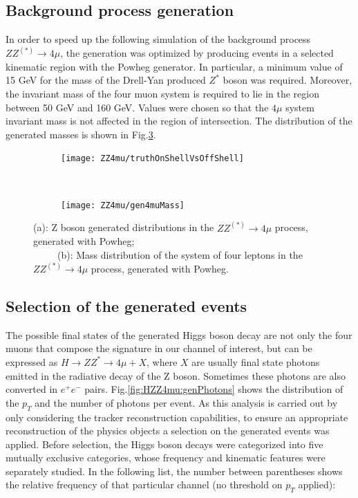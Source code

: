 \documentclass[a4paper,twoside,12pt]{book}
\begin{document}
\subsection{Background process generation}\label{physics:bkgGeneration}
In order to speed up the following simulation of the background process $ZZ^{(*)} \rightarrow 4\mu$, the generation was optimized by
producing events in a selected kinematic region with the Powheg generator\cite{Powheg}. In particular, a minimum value of 15 GeV for the mass of
the Drell-Yan produced $Z^*$ boson was required. Moreover, the invariant mass of the four muon system is required 
to lie in the region between 50 GeV and 160 GeV. Values were chosen so that the $4\mu$ system invariant mass is not affected in the region of intersection. The distribution of the generated masses is shown 
in Fig.\ref{fig:ZZ4mu:genMasses}.\\

\begin{figure}
\begin{subfigure}{\linewidth}
\centering
\texttt{[image: ZZ4mu/truthOnShellVsOffShell]}
\caption{}
\label{fig:ZZ4mu:truthOnShellVsOffShell}
\end{subfigure}\\[1 ex]
\begin{subfigure}{\linewidth}
\centering
\texttt{[image: ZZ4mu/gen4muMass]}
\caption{}
\label{fig:ZZ4mu:gen4muMass}
\end{subfigure}
\caption{(a): Z boson generated distributions in the $ZZ^{(*)} \rightarrow 4\mu$ process, generated with Powheg;\\
\ \ \ \ \ (b): Mass distribution of the system of four leptons in the $ZZ^{(*)} \rightarrow 4\mu$ process, generated with Powheg.}
\label{fig:ZZ4mu:genMasses}
\end{figure}


\subsection{Selection of the generated events}
The possible final states of the generated Higgs boson decay are not only the four muons that 
compose the signature in our channel of interest, but can be expressed as $H \rightarrow
ZZ^* \rightarrow 4\mu + X$, where $X$ are usually final state photons emitted in the
radiative decay of the Z boson. Sometimes these photons are also converted in $e^{+}e^{-}$ pairs. Fig.\ref{fig:HZZ4mu:genPhotons} shows the distribution of the $p_{T}$ and the number
of photons per event. 
 As this analysis is carried out by only considering the tracker reconstruction capabilities, to ensure 
an appropriate reconstruction of the physics objects a selection on the 
generated events was applied. Before selection, the Higgs boson decays were categorized into five 
mutually exclusive categories, whose frequency and kinematic features were separately 
studied. In the following list, the number between parentheses shows the relative frequency
of that particular channel (no threshold on $p_{T}$ applied):
\end{document}

